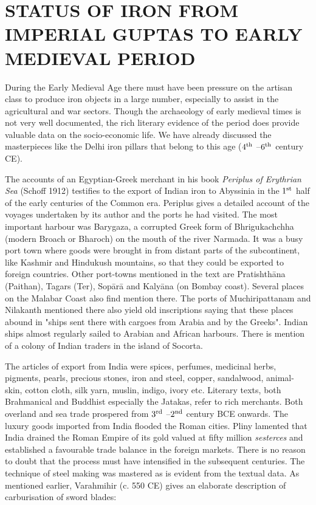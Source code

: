 \section*{STATUS OF IRON FROM IMPERIAL GUPTAS TO EARLY MEDIEVAL PERIOD}\label{section-1}

During the Early Medieval Age there must have been pressure on the artisan class to produce iron objects in a large number, especially to assist in the agricultural and war sectors. Though the archaeology of early medieval times is not very well documented, the rich literary evidence of the period does provide valuable data on the socio-economic life. We have already discussed the masterpieces like the Delhi iron pillars that belong to this age ($4^{\rm th}$ –$6^{\rm th}$  century CE).

The accounts of an Egyptian-Greek merchant in his book {\it Periplus of Erythrian Sea} (Schoff 1912) testifies to the export of Indian iron to Abyssinia in the $1^{\rm st}$ half of the early centuries of the Common era. Periplus gives a detailed account of the voyages undertaken by its author and the ports he had visited. The most important harbour was Barygaza, a corrupted Greek form of Bhrigukachchha (modern Broach or Bharoch) on the mouth of the river Narmada. It was a busy port town where goods were brought in from distant parts of the subcontinent, like Kashmir and Hindukush mountains, so that they could be exported to foreign countries. Other port-towns mentioned in the text are Pratishthāna (Paithan), Tagars (Ter), Sopārā and Kalyāna (on Bombay coast). Several places on the Malabar Coast also find mention there. The ports of Muchiripattanam and Nilakanth mentioned there also yield old inscriptions saying that these places abound in "ships sent there with cargoes from Arabia and by the Greeks". Indian ships almost regularly sailed to Arabian and African harbours. There is mention of a colony of Indian traders in the island of Socorta.

The articles of export from India were spices, perfumes, medicinal herbs, pigments, pearls, precious stones, iron and steel, copper, sandalwood, animal-skin, cotton cloth, silk yarn, muslin, indigo, ivory etc. Literary texts, both Brahmanical and Buddhist especially the Jatakas, refer to rich merchants. Both overland and sea trade prospered from $3^{\rm rd}$ –$2^{\rm nd}$ century BCE onwards. The luxury goods imported from India flooded the Roman cities. Pliny lamented that India drained the Roman Empire of its gold valued at fifty million {\it sesterces} and established a favourable trade balance in the foreign markets. There is no reason to doubt that the process must have intensified in the subsequent centuries. The technique of steel making was mastered as is evident from the textual data. As mentioned earlier, Varahmihir (c. 550 CE) gives an elaborate description of carburisation of sword blades: 

